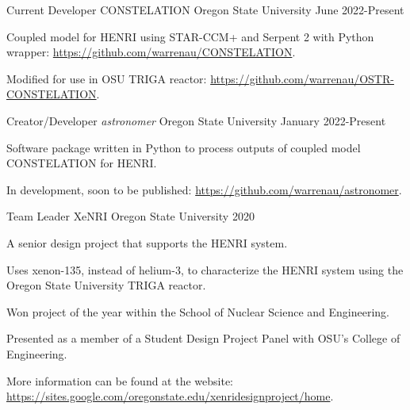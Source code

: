 
\begin{cventries}
  \cventry
    {Current Developer}      %
    {CONSTELATION}           %
    {Oregon State University}%
    {June 2022-Present}   %
    {
    \begin{cvitems}
        \item{Coupled model for HENRI using STAR-CCM+ and Serpent 2 with Python wrapper: \href{https://github.com/warrenau/CONSTELATION}{https://github.com/warrenau/CONSTELATION}.}
        \item{Modified for use in OSU TRIGA reactor: \href{https://github.com/warrenau/OSTR-CONSTELATION}{https://github.com/warrenau/OSTR-CONSTELATION}.}
    \end{cvitems}
    }


  \cventry
    {Creator/Developer}                %
    {\textit{astronomer}}             %
    {Oregon State University}%
    {January 2022-Present}   %
    {
    \begin{cvitems}
        \item{Software package written in Python to process outputs of coupled model CONSTELATION for HENRI.}
        \item{In development, soon to be published: \href{https://github.com/warrenau/astronomer}{https://github.com/warrenau/astronomer}.}
    \end{cvitems}
    }

  
  \cventry
    {Team Leader} %
    {XeNRI} %
    {Oregon State University} %
    {2020} %
    {
      \begin{cvitems} %
        \item{A senior design project that supports the HENRI system.}
		\item {Uses xenon-135, instead of helium-3, to characterize the HENRI system using the Oregon State University TRIGA reactor.}
		\item {Won project of the year within the School of Nuclear Science and Engineering.}
		\item{Presented as a member of a Student Design Project Panel with OSU's College of Engineering.}
        \item{More information can be found at the website: \href{https://sites.google.com/oregonstate.edu/xenridesignproject/home}{https://sites.google.com/oregonstate.edu/xenridesignproject/home}.}
      \end{cvitems}
    }



\end{cventries}
